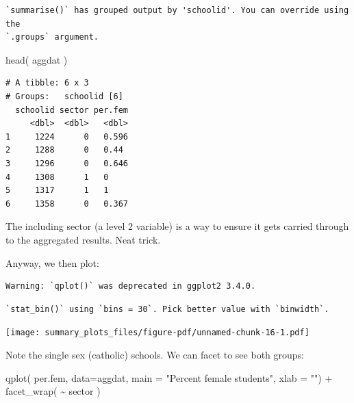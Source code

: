 \documentclass[
  letterpaper,
  DIV=11,
  numbers=noendperiod]{scrreprt}
\newenvironment{Shaded}{}{}
\newcommand{\AttributeTok}[1]{\textcolor[rgb]{0.49,0.56,0.16}{#1}}
\newcommand{\FunctionTok}[1]{\textcolor[rgb]{0.02,0.16,0.49}{#1}}
\newcommand{\NormalTok}[1]{#1}
\newcommand{\SpecialCharTok}[1]{\textcolor[rgb]{0.25,0.44,0.63}{#1}}
\newcommand{\StringTok}[1]{\textcolor[rgb]{0.25,0.44,0.63}{#1}}
\begin{document}
\begin{verbatim}
`summarise()` has grouped output by 'schoolid'. You can override using the
`.groups` argument.
\end{verbatim}

\begin{Shaded}
\begin{Highlighting}[]
\FunctionTok{head}\NormalTok{( aggdat )}
\end{Highlighting}
\end{Shaded}

\begin{verbatim}
# A tibble: 6 x 3
# Groups:   schoolid [6]
  schoolid sector per.fem
     <dbl>  <dbl>   <dbl>
1     1224      0   0.596
2     1288      0   0.44 
3     1296      0   0.646
4     1308      1   0    
5     1317      1   1    
6     1358      0   0.367
\end{verbatim}

The including sector (a level 2 variable) is a way to ensure it gets
carried through to the aggregated results. Neat trick.

Anyway, we then plot:

\begin{Shaded}
\end{Shaded}

\begin{verbatim}
Warning: `qplot()` was deprecated in ggplot2 3.4.0.
\end{verbatim}

\begin{verbatim}
`stat_bin()` using `bins = 30`. Pick better value with `binwidth`.
\end{verbatim}

\texttt{[image: summary\_plots\_files/figure-pdf/unnamed-chunk-16-1.pdf]}

Note the single sex (catholic) schools. We can facet to see both groups:

\begin{Shaded}
\begin{Highlighting}[]
\FunctionTok{qplot}\NormalTok{( per.fem, }\AttributeTok{data=}\NormalTok{aggdat,}
       \AttributeTok{main =} \StringTok{"Percent female students"}\NormalTok{, }
       \AttributeTok{xlab =} \StringTok{""}\NormalTok{) }\SpecialCharTok{+}
  \FunctionTok{facet\_wrap}\NormalTok{( }\SpecialCharTok{\textasciitilde{}}\NormalTok{ sector )}
\end{Highlighting}
\end{Shaded}
\end{document}
